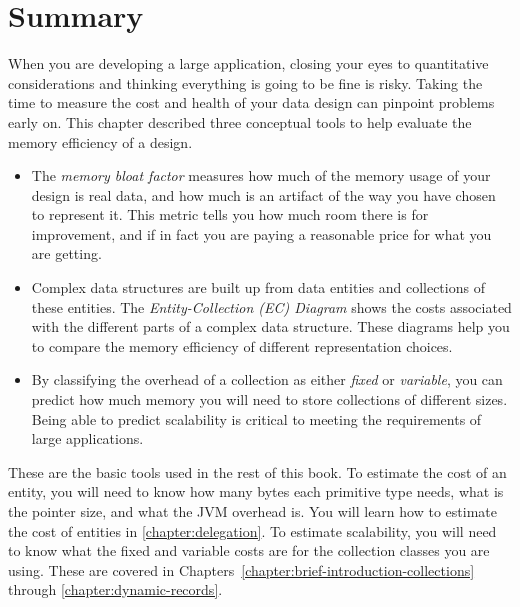 \section{Summary}

When you are developing a large application, closing your eyes to quantitative
considerations and thinking everything is going to be fine is risky. Taking the
time to measure the cost and health of your data design can pinpoint problems
early on. This chapter described three conceptual tools to help evaluate the
memory efficiency of a design.
\begin{itemize}
\item The \textsl{memory bloat factor} measures how much of the memory
usage of your design is real data, and how much is an artifact of the way you
have chosen to represent it. This metric tells you how much room there is for
improvement, and if in fact you are paying a reasonable price for what you are
getting.
\item Complex data structures are built up from data entities and collections of
these entities.  The \textsl{Entity-Collection (EC) Diagram} shows the costs
associated with the different parts of a complex data structure. These diagrams
help you to compare the memory efficiency of different representation choices.
\item By classifying the overhead of a collection as either \textsl{fixed} or
\textsl{variable}, you can predict how much memory you will need to store
collections of different sizes. Being able to predict scalability is critical to
meeting the requirements of large applications.
\end{itemize}
These are the basic tools used in the rest of this book. To estimate the cost of
an entity, you will need to know how many bytes each primitive type needs, what
is the pointer size, and what the JVM overhead is. You will learn how to
estimate the cost of entities in \autoref{chapter:delegation}. To estimate scalability,
you will need to know what the fixed and variable costs are for the collection classes
you are using. These are covered in Chapters~\ref{chapter:brief-introduction-collections}
through \ref{chapter:dynamic-records}.

